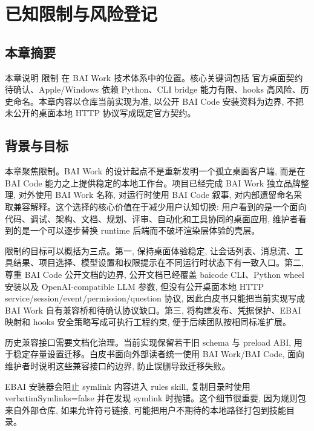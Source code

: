 \chapter{已知限制与风险登记}
\section{本章摘要}
本章说明 限制 在 BAI Work 技术体系中的位置。核心关键词包括 官方桌面契约待确认、Apple/Windows 依赖 Python、CLI bridge 能力有限、hooks 高风险、历史命名。本章内容以仓库当前实现为准, 以公开 BAI Code 安装资料为边界, 不把未公开的桌面本地 HTTP 协议写成既定官方契约。

\section{背景与目标}
本章聚焦限制。BAI Work 的设计起点不是重新发明一个孤立桌面客户端, 而是在 BAI Code 能力之上提供稳定的本地工作台。项目已经完成 BAI Work 独立品牌整理, 对外使用 BAI Work 名称, 对运行时使用 BAI Code 叙事, 对内部遗留命名采取兼容解释。这个选择的核心价值在于减少用户认知切换: 用户看到的是一个面向代码、调试、架构、文档、规划、评审、自动化和工具协同的桌面应用, 维护者看到的是一个可以逐步替换 runtime 后端而不破坏渲染层体验的壳层。

限制的目标可以概括为三点。第一, 保持桌面体验稳定, 让会话列表、消息流、工具结果、项目选择、模型设置和权限提示在不同运行时状态下有一致入口。第二, 尊重 BAI Code 公开文档的边界, 公开文档已经覆盖 baicode CLI、Python wheel 安装以及 OpenAI-compatible LLM 参数, 但没有公开桌面本地 HTTP service/session/event/permission/question 协议, 因此白皮书只能把当前实现写成 BAI Work 自有兼容桥和待确认协议缺口。第三, 将构建发布、凭据保护、EBAI 映射和 hooks 安全策略写成可执行工程约束, 便于后续团队按相同标准扩展。

历史兼容接口需要文档化治理。当前实现保留若干旧 schema 与 preload ABI, 用于稳定存量设置迁移。白皮书面向外部读者统一使用 BAI Work/BAI Code, 面向维护者时说明这些兼容接口的边界, 防止误删导致迁移失败。

EBAI 安装器会阻止 symlink 内容进入 rules skill, 复制目录时使用 verbatimSymlinks=false 并在发现 symlink 时抛错。这个细节很重要, 因为规则包来自外部仓库, 如果允许符号链接, 可能把用户不期待的本地路径打包到技能目录。

